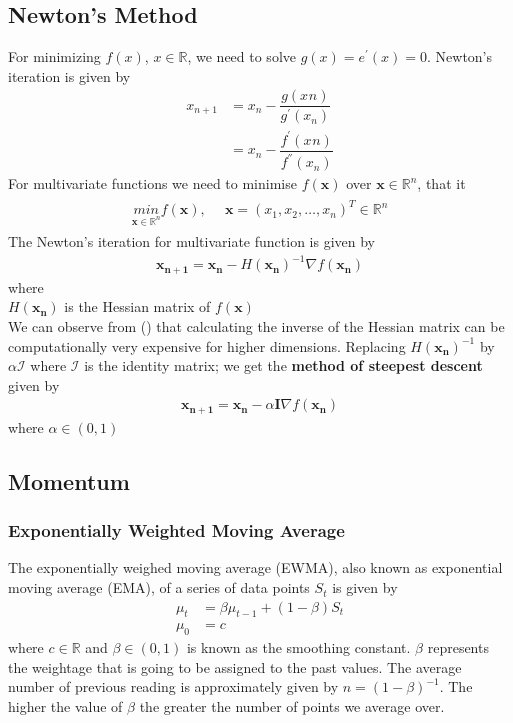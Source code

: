 \subsection*{Newton's Method}
For minimizing $f(x)$, $x \in \mathbb{R}$, we need to solve $g(x) = e^{'}(x)=0$. Newton's iteration is given by 
\begin{align}
  x_{n+1} &= x_{n} - \dfrac{g(x_{}n)}{g^{'}(x_n)} \\
          &= x_{n} - \dfrac{f^{'}(x_{}n)}{f^{''}(x_n)}
\end{align}
For multivariate functions we need to minimise $f(\mathbf{x})$ over $\mathbf{x} \in \mathbb{R}^n$, that it
\begin{align}
  \begin{matrix}
    \underset{\mathbf{x}\in\mathbb{R}^n}{min} f(\mathbf{x}), & \,\,\, \mathbf{x} =(x_1,x_2,\dots,x_n)^T \in \mathbb{R}^n
  \end{matrix} 
\end{align}
The Newton's iteration for multivariate function is given by
\begin{align}
  \mathbf{x_{n+1}} = \mathbf{x_{n}} - H(\mathbf{x_n})^{-1}\nabla f(\mathbf{x_n})
\end{align}
where\\
\indent $H(\mathbf{x_n})$ is the Hessian matrix of $f(\mathbf{x})$\\
\noindent We can observe from () that calculating the inverse of the Hessian matrix can be computationally very expensive for higher dimensions. Replacing $H(\mathbf{x_n})^{-1}$ by $\alpha \mathcal{I}$ where $\mathcal{I}$ is the identity matrix; we get the \textbf{method of steepest descent} given by
\begin{align}
  \mathbf{x_{n+1}} = \mathbf{x_{n}} - \alpha \textbf{I} \nabla f(\mathbf{x_n})
\end{align}
where $\alpha \in (0,1)$
\subsection*{Momentum}
\subsubsection*{Exponentially Weighted Moving Average}
The exponentially weighed moving average (EWMA), also known as exponential moving average (EMA), of a series of data points $S_t$ is given by 
\begin{align}
    \label{eq:ewma_def}
    \mu_t &= \beta \mu_{t-1} + (1-\beta)S_t \\
    \nonumber
    \mu_0 &= c
\end{align}
where $c \in \mathbb{R}$ and $\beta \in (0,1)$ is known as the smoothing constant. $\beta$ represents the weightage that is going to be assigned to the past values. The average number of previous reading is approximately given by $n={(1-\beta)}^{-1}$. The higher the value of $\beta$ the greater the number of points we average over.

